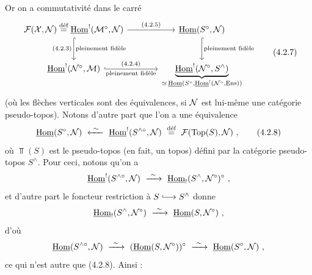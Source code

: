 Or on a commutativité dans le carré
\[
\begin{tikzcd}[column sep=large, row sep=large]
\cF(\cX,\cN) \defeq \uHom^{!}(\cM^{\circ},\cN) \arrow[r, "\text{\scriptsize(4.2.5)}"] \arrow[d, hook, "\text{\scriptsize(4.2.3)}"', "\text{\scriptsize pleinement fidèle}"] & \uHom(S^{\circ},\cN) \arrow[d, hook, "\text{\scriptsize pleinement fidèle}"] \\
\uHom^{!}(\cN^{\circ},\cM) \arrow[r, hook, "\text{\scriptsize(4.2.4)}", "\text{\scriptsize pleinement fidèle}"'] & \underbrace{\uHom^{!}(\cN^{\circ},S^{\wedge})}_{\simeq\, \uHom(S^{\circ},\uHom^{!}(\cN^{\circ},\Ens))}
\end{tikzcd}
\tag*{(4.2.7)}
\]
(où les flèches verticales sont des équivalences, si $\mathcal{N}$ est lui-même une catégorie pseudo-topos). Notons d'autre part que l'on a une équivalence
\[
\uHom(S^{\circ},\cN) \ \xleftarrow{\ \sim\ }\ \uHom^{!}(S^{\wedge\circ},\cN) \ \defeq\ \cF(\Top(S),\cN) \ ,
\tag*{(4.2.8)}
\]
où $\Top(S)$ est le pseudo-topos (en fait, un topos) défini par la catégorie pseudo-topos $S^{\wedge}$. Pour ceci, notons qu'on a
\[
\uHom^{!}(S^{\wedge\circ},\cN) \ \xrightarrow{\ \sim\ }\ \uHom_{!}(S^{\wedge},\cN^{\circ})^{\circ} \ ,
\]
et d'autre part le foncteur restriction à $S \linj S^{\wedge}$ donne
\[
\uHom_{!}(S^{\wedge},\cN^{\circ}) \ \xrightarrow{\ \sim\ }\ \uHom(S,\cN^{\circ}) \ ,
\]
d'où
\[
\uHom(S^{\wedge\circ},\cN) \ \xrightarrow{\ \sim\ }\ (\uHom(S,\cN^{\circ}))^{\circ} \ \xrightarrow{\ \sim\ }\ \uHom(S^{\circ},\cN) \ ,
\]
ce qui n'est autre que (4.2.8). Ainsi :

